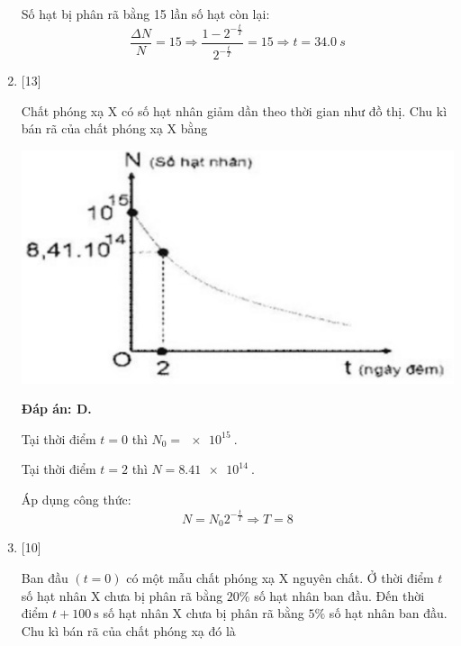 \begin{enumerate}[label=\bfseries Câu \arabic*:]
{		Số hạt bị phân rã bằng 15 lần số hạt còn lại:
		$$\dfrac{\Delta N}{N} = 15 \Rightarrow \dfrac{1-2^{-\frac{t}{T}}}{2^{-\frac{t}{T}}} = 15 \Rightarrow t = \SI{34.0}{s}$$
		
	}
	\item {} [13]
	\cauhoi
	{
		Chất phóng xạ X có số hạt nhân giảm dần theo thời gian như đồ thị. Chu kì bán rã của chất phóng xạ X bằng
		\begin{center}
			\includegraphics[scale=0.8]{../figs/VN12-2021-PH-TP038-1}
		\end{center}
		
	}
	
	\loigiai
	{		\textbf{Đáp án: D.}
		
		Tại thời điểm $t=0$ thì $N_0 = \SI{e15}{}$.
		
		Tại thời điểm $t=2$ thì $N=\SI{8.41e14}{}$.
		
		Áp dụng công thức:
		$$N=N_0 2^{-\frac{t}{T}} \Rightarrow T = 8$$
		
	}
	\item {} [10]
	\cauhoi
	{Ban đầu $(t=0)$ có một mẫu chất phóng xạ X nguyên chất. Ở thời điểm $t$ số hạt nhân X chưa bị phân rã bằng $20\%$ số hạt nhân ban đầu. Đến thời điểm $t+100\ \text{s}$ số hạt nhân X chưa bị phân rã bằng $5\%$ số hạt nhân ban đầu. Chu kì bán rã của chất phóng xạ đó là
	}
	

\end{enumerate}
